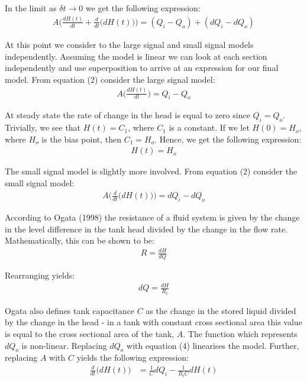 \documentclass{article}
\begin{document}
In the limit as $\delta t \rightarrow 0$ we get the following expression:
\begin{align}
	A\bigg(\frac{dH(t)}{dt} + \frac{d}{dt}\big(dH(t)\big)\bigg) = (Q_i - Q_o) + (dQ_i - dQ_o)
\end{align}

At this point we consider to the large signal and small signal models independently. Assuming the model is linear we can look at each section independently and use superposition to arrive at an expression for our final model. From equation (2) consider the large signal model:
\begin{align}
	A\bigg(\frac{dH(t)}{dt}\bigg) = Q_i - Q_o  \nonumber
\end{align}

At steady state the rate of change in the head is equal to zero since $Q_i= Q_o$. Trivially, we see that $H(t) = C_1$, where $C_1$ is a constant. If we let $H(0) = H_o$, where $H_o$ is the bias point, then $C_1 = H_o$. Hence, we get the following expression:
\begin{align}
	H(t) = H_o
\end{align}

The small signal model is slightly more involved. From equation (2) consider the small signal model:
\begin{align}
	A\bigg(\frac{d}{dt}\big(dH(t)\big)\bigg) = dQ_i - dQ_o \nonumber
\end{align}

According to Ogata (1998) the resistance of a fluid system is given by the change in the level difference in the tank head divided by the change in the flow rate. Mathematically, this can be shown to be:
\begin{align}
	R = \frac{dH}{dQ} \nonumber
\end{align}

Rearranging yields:
\begin{align}
dQ = \frac{dH}{R_t}
\end{align}

Ogata also defines tank capacitance $C$ as the change in the stored liquid divided by the change in the head - in a tank with constant cross sectional area this value is equal to the cross sectional area of the tank, $A$. The function which represents $dQ_o$ is non-linear. Replacing $dQ_o$ with equation (4) linearises the model. Further, replacing $A$ with $C$ yields the following expression:
\begin{align}
\frac{d}{dt}\big(dH(t)\big) &= \frac{1}{C}dQ_i - \frac{1}{R_{t}C}dH(t)
\end{align}
\end{document}
